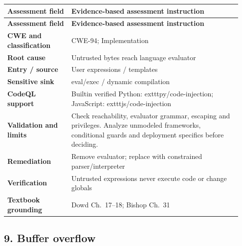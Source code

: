\documentclass[11pt,letterpaper,oneside]{book}
\begin{document}
\small
\setlength{\tabcolsep}{2pt}
\renewcommand{\arraystretch}{1.18}
\begin{longtable}{>{\raggedright\arraybackslash}p{0.26\linewidth}>{\raggedright\arraybackslash}p{0.69\linewidth}}
\toprule
\textbf{Assessment field} & \textbf{Evidence-based assessment instruction}\\
\midrule
\endfirsthead
\toprule
\textbf{Assessment field} & \textbf{Evidence-based assessment instruction}\\
\midrule
\endhead
\textbf{CWE and classification} & CWE-94; Implementation\\
\textbf{Root cause} & Untrusted bytes reach language evaluator\\
\textbf{Entry / source} & User expressions / templates\\
\textbf{Sensitive sink} & eval/exec / dynamic compilation\\
\textbf{CodeQL support} & Builtin verified Python: 	exttt{py/code-injection}; JavaScript: 	exttt{js/code-injection}\\
\textbf{Validation and limits} & Check reachability, evaluator grammar, escaping and privileges. Analyze unmodeled frameworks, conditional guards and deployment specifics before deciding.\\
\textbf{Remediation} & Remove evaluator; replace with constrained parser/interpreter\\
\textbf{Verification} & Untrusted expressions never execute code or change globals\\
\textbf{Textbook grounding} & Dowd Ch.~17--18; Bishop Ch.~31\\
\bottomrule
\end{longtable}
\normalsize

\subsection{9. Buffer overflow}
\end{document}
